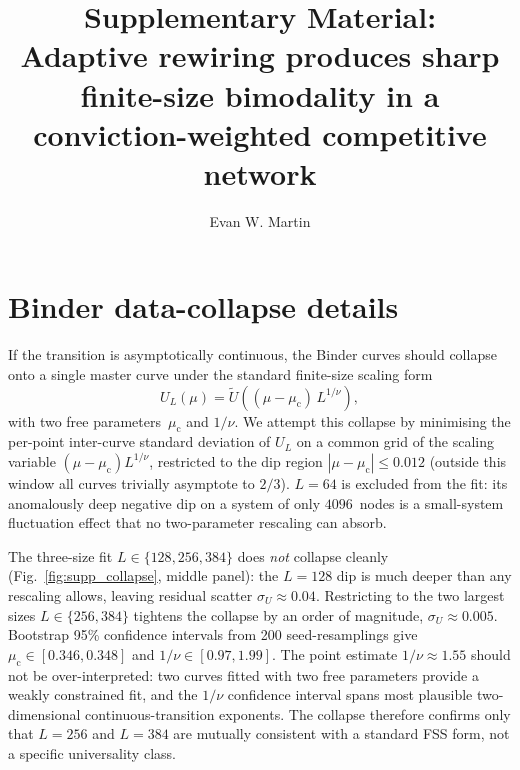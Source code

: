\documentclass[preprint,12pt]{elsarticle}
\newcommand{\mc}{\mu_\mathrm{c}}
\newcommand{\Lsys}{L}
\begin{document}
\begin{frontmatter}

\title{Supplementary Material: \\
Adaptive rewiring produces sharp finite-size
bimodality in a conviction-weighted competitive network}

\author{Evan W. Martin}

\end{frontmatter}

\section{Binder data-collapse details}
\label{sec:supp_collapse}

If the transition is asymptotically continuous, the
Binder curves should collapse onto a single master
curve under the standard finite-size scaling form
\begin{equation}
U_\Lsys(\mu) = \tilde{U}\!\left((\mu - \mc)\, \Lsys^{1/\nu}\right),
\label{eq:supp_collapse}
\end{equation}
with two free parameters~$\mc$ and $1/\nu$.
We attempt this collapse by minimising the per-point
inter-curve standard deviation of $U_\Lsys$ on a common
grid of the scaling variable $(\mu-\mc)\Lsys^{1/\nu}$,
restricted to the dip region $|\mu - \mc| \leq 0.012$
(outside this window all curves trivially asymptote
to $2/3$).
$\Lsys = 64$ is excluded from the fit: its anomalously
deep negative dip on a system of only $4096$~nodes is a
small-system fluctuation effect that no two-parameter
rescaling can absorb.

The three-size fit $\Lsys \in \{128, 256, 384\}$ does
\emph{not} collapse cleanly
(Fig.~\ref{fig:supp_collapse}, middle panel):
the $\Lsys = 128$ dip is much deeper than any rescaling
allows, leaving residual scatter
$\sigma_U \approx 0.04$.
Restricting to the two largest sizes
$\Lsys \in \{256, 384\}$ tightens the collapse by an order
of magnitude, $\sigma_U \approx 0.005$.
Bootstrap 95\% confidence intervals from 200
seed-resamplings give $\mc \in [0.346, 0.348]$ and
$1/\nu \in [0.97, 1.99]$.
The point estimate $1/\nu \approx 1.55$ should not be
over-interpreted: two curves fitted with two free
parameters provide a weakly constrained fit, and the
$1/\nu$ confidence interval spans most plausible
two-dimensional continuous-transition exponents.
The collapse therefore confirms only that
$\Lsys = 256$ and $\Lsys = 384$ are mutually consistent
with a standard FSS form, not a specific universality
class.
\end{document}
